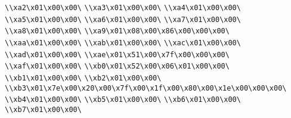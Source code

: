 \verb|\\xa2\x01\x00\x00\|\newline
\verb|\\xa3\x01\x00\x00\|\newline
\verb|\\xa4\x01\x00\x00\|\newline
\verb|\\xa5\x01\x00\x00\|\newline
\verb|\\xa6\x01\x00\x00\|\newline
\verb|\\xa7\x01\x00\x00\|\newline
\verb|\\xa8\x01\x00\x00\|\newline
\verb|\\xa9\x01\x08\x00\x86\x00\x00\x00\|\newline
\verb|\\xaa\x01\x00\x00\|\newline
\verb|\\xab\x01\x00\x00\|\newline
\verb|\\xac\x01\x00\x00\|\newline
\verb|\\xad\x01\x00\x00\|\newline
\verb|\\xae\x01\x51\x00\x7f\x00\x00\x00\|\newline
\verb|\\xaf\x01\x00\x00\|\newline
\verb|\\xb0\x01\x52\x00\x06\x01\x00\x00\|\newline
\verb|\\xb1\x01\x00\x00\|\newline
\verb|\\xb2\x01\x00\x00\|\newline
\verb|\\xb3\x01\x7e\x00\x20\x00\x7f\x00\x1f\x00\x80\x00\x1e\x00\x00\x00\|\newline
\verb|\\xb4\x01\x00\x00\|\newline
\verb|\\xb5\x01\x00\x00\|\newline
\verb|\\xb6\x01\x00\x00\|\newline
\verb|\\xb7\x01\x00\x00\|\newline
